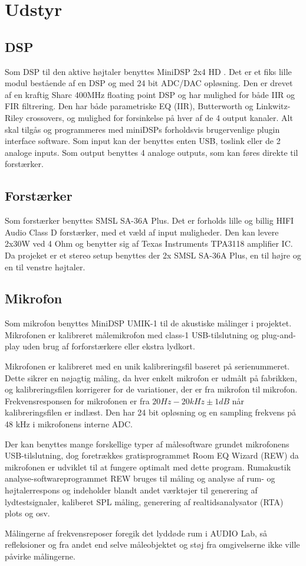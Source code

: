 \section{Udstyr}
\subsection{DSP}
Som DSP til den aktive højtaler benyttes MiniDSP 2x4 HD \cite{dsp}. Det er et fiks lille modul bestående af en DSP og med 24 bit ADC/DAC opløsning. Den er drevet af en kraftig Sharc 400MHz floating point DSP og har mulighed for både IIR og FIR filtrering. Den har både parametriske EQ (IIR), Butterworth og Linkwitz-Riley crossovers, og mulighed for forsinkelse på hver af de 4 output kanaler. Alt skal tilgås og programmeres med miniDSPs forholdsvis brugervenlige plugin interface software.
Som input kan der benyttes enten USB, toslink eller de 2 analoge inputs. Som output benyttes 4 analoge outputs, som kan føres direkte til forstærker.

\subsection{Forstærker}
Som forstærker benyttes SMSL SA-36A Plus\cite{amplifier}. Det  er forholds lille og billig HIFI Audio Class D forstærker, med et væld af input muligheder. Den kan levere 2x30W ved 4 Ohm og benytter sig af Texas Instruments TPA3118 amplifier IC.
Da projeket er et stereo setup benyttes der 2x SMSL SA-36A Plus, en til højre og en til venstre højtaler.  


\subsection{Mikrofon}
Som mikrofon  benyttes MiniDSP UMIK-1 \cite{mikrofon} til de akustiske målinger i projektet. Mikrofonen er kalibreret målemikrofon med class-1 USB-tilslutning og  plug-and-play uden brug af forforstærkere eller ekstra lydkort. 

Mikrofonen er kalibreret med en unik kalibreringsfil baseret på serienummeret. Dette sikrer en nøjagtig måling, da hver enkelt mikrofon er udmålt på fabrikken, og kalibreringsfilen korrigerer for de variationer, der er fra mikrofon til mikrofon. Frekvensresponsen for mikrofonen er fra $ 20Hz - 20kHz \pm1dB $ når kalibreringsfilen er indlæst. Den har 24 bit opløsning og en sampling frekvens på 48 kHz i mikrofonens interne ADC.

Der kan benyttes mange forskellige typer af målesoftware grundet mikrofonens USB-tilslutning, dog foretrækkes gratisprogrammet Room EQ Wizard (REW) da mikrofonen er udviklet til at fungere optimalt med dette program. Rumakustik analyse-softwareprogrammet REW bruges til måling og analyse af rum- og højtalerrespons og indeholder blandt andet værktøjer til generering af lydtestsignaler, kaliberet SPL måling, generering af realtidsanalysator (RTA) plots og osv. 

Målingerne af frekvensreposer foregik  det lyddøde rum i AUDIO Lab, så  refleksioner og fra andet end selve måleobjektet og støj fra omgivelserne ikke ville påvirke målingerne.

